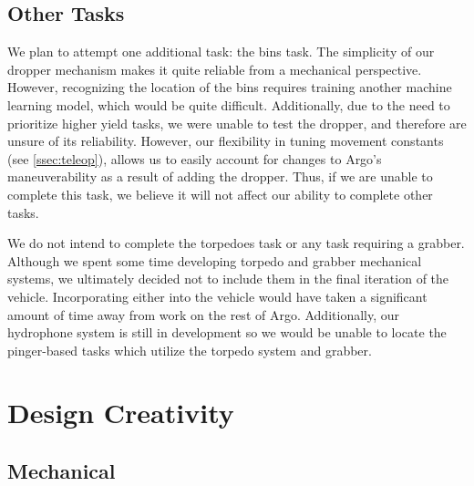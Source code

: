\documentclass[conference]{IEEEtran}
\begin{document}
\subsection{Other Tasks}
\label{ssec:remaining_tasks}
We plan to attempt one additional task: the bins task. The simplicity of our dropper mechanism makes it quite reliable from a mechanical perspective. However, recognizing the location of the bins requires training another machine learning model, which would be quite difficult. Additionally, due to the need to prioritize higher yield tasks, we were unable to test the dropper, and therefore are unsure of its reliability.  However, our flexibility in tuning movement constants (see \ref{ssec:teleop}), allows us to easily account for changes to Argo’s maneuverability as a result of adding the dropper. Thus, if we are unable to complete this task, we believe it will not affect our ability to complete other tasks.

We do not intend to complete the torpedoes task or any task requiring a grabber. Although we spent some time developing torpedo and grabber mechanical systems, we ultimately decided not to include them in the final iteration of the vehicle. Incorporating either into the vehicle would have taken a significant amount of time away from work on the rest of Argo. Additionally, our hydrophone system is still in development so we would be unable to locate the pinger-based tasks which utilize the torpedo system and grabber.



\section{Design Creativity}
\label{sec:design}


\subsection{Mechanical}
\label{ssec:mechanical}
\end{document}
